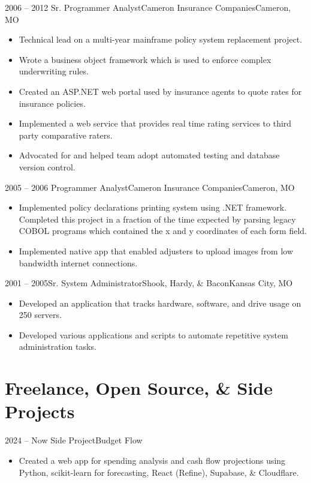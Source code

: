 \documentclass[11pt,letterpaper,final]{moderncv}
\begin{document}
	\cventry
{2006 -- 2012} {Sr. Programmer Analyst}{Cameron Insurance Companies}{Cameron, MO}{}{
		\begin{itemize}
			\item 
				Technical lead on a multi-year mainframe policy system
				replacement project.
			\item 
				Wrote a business object framework which is used to enforce
				complex underwriting rules.
			\item 
				Created an ASP.NET web portal used by insurance agents to quote
				rates for insurance policies.
			\item 
				Implemented a web service that provides real time rating
				services to third party comparative raters.
			\item
				Advocated for and helped team adopt automated testing
				and database version control.
		\end{itemize}
}
\linebreak

	\cventry
{2005 -- 2006} {Programmer Analyst}{Cameron Insurance Companies}{Cameron, MO}{}{
		\begin{itemize}
			\item
				Implemented policy declarations printing system using .NET framework.
				Completed this project in a fraction of the time expected by
				parsing legacy COBOL programs which contained the x and y
				coordinates of each form field.
			\item
				Implemented native app that enabled adjusters to upload images
				from low bandwidth internet connections.
		\end{itemize}
}
\linebreak

	\cventry
{2001 -- 2005}{Sr. System Administrator}{Shook, Hardy, \& Bacon}{Kansas City, MO}{}{
		\begin{itemize}
			\item
				Developed an application that tracks hardware, software, and
				drive usage on 250 servers.
			\item
				Developed various applications and scripts to automate
				repetitive system administration tasks.
		\end{itemize}
}
\linebreak

\section{Freelance, Open Source, \& Side Projects} 
	\cventry
{2024 -- Now} {Side Project}{Budget Flow}{}{}{
		\begin{itemize}
			\item
				Created a web app for spending analysis and cash flow projections using
				Python, scikit-learn for forecasting, React (Refine), Supabase, \&
				Cloudflare.
		\end{itemize}
}
\linebreak
\end{document}
